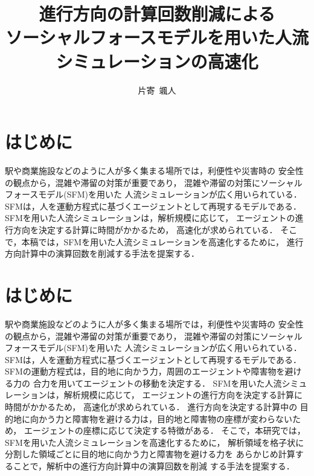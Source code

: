 \documentclass{maelab_y}
\newcommand{\分類条件}{
\begin{table}[t]
\begin{center}
\caption{進行方向を分類する条件}
\ecaption{Classification condition of moving direction $e_{i}$.}
\label{tb:hantei_jouken}
\begin{tabular}{c|c|c|c|c}
\hline \hline
			& 右 & 左 & 上 & 下 \\ \hline
パターン2   & $\frac{1}{\sqrt{2}} < e_x \leq 1  $
		    & $ -1 \leq e_x < \frac{-1}{\sqrt{2}}$ 
		    & $ \frac{-1}{\sqrt{2}} < e_x < \frac{1}{\sqrt{2}} $ 
		    & $ \frac{-1}{2} < e_x < \frac{1}{2} $ \\
パターン3   & $\frac{-1}{2} < e_y < \frac{1}{2} $ 
		    & $\frac{-1}{2} < e_y < \frac{1}{2} $
            & $ \frac{1}{\sqrt{2}} < e_y \leq 1$
		    & $ -1 \leq e_y < \frac{-1}{\sqrt{2}} $ \\
\hline
\multirow{2}{*}{パターン4}   
			& $R_x \geq A_x$ & $R_x < A_x$ & $R_y \geq A_y$ & $R_y < A_y $ \\
	        &  $L_x \geq A_x$ & $L_x < A_x$ & $L_y \geq A_y$ & $L_y < A_y$ \\
\hline
\multirow{2}{*}{パターン5}   
 			& $R_x \geq x_1$ & $R_x < x_2$ & $R_y \geq y_1$ & $R_y < y_2 $ \\
			& $L_x \geq x_1$ & $L_x < x_2$ & $L_y \geq y_1$ & $L_y < y_2 $ \\
\hline
パターン6   & $ \cos(\frac{1}{2}\theta_{view}) \leq  e_y $ 
			& $ e_y \leq -\cos(\frac{1}{2}\theta_{view})$ 
			& $ \sin(\frac{1}{2}(\pi - \theta_{view})) \leq e_x $ 
			& $ e_x \leq \sin(\frac{1}{2}(\pi - \theta_{view}))  $ \\
\hline
\end{tabular}
\end{center}
\end{table}}
\newcommand{\距離計算回数}{
\begin{table}[hbtp]
\begin{center}
\caption{エージェント間距離の計算回数[$10^{10}$回]}
\label{tb:count_result_yobi}
\begin{tabular}{c|r|r|r|r|r|r}
\hline \hline
	人数 & 1 & 2 & 3 & 4 & 5 & 6 \\  
	\hline
	\multirow{2}{*}{3000} 
	& 5.1   & $\mathbf{3.9}$   & 4.0    & 4.4    & 4.1    & 4.4   \\  
	&       & ($\mathbf{24.5}$\%) 					& (22.9\%) & (15.3\%) & (20.7\%) & (15.2\%) \\ \hline
	\multirow{2}{*}{5000} 
	& 14.4  &  $\mathbf{10.9}$  					  & 11.1   & 12.2   & 11.4   & 12.2  \\  
	&       & ($\mathbf{23.8}$\%) 					& (22.6\%) & (15.2\%) & (20.5\%) & (15.1\%) \\ \hline
	\multirow{2}{*}{7500} 
	& 33.1  & $\mathbf{25.2}$	 		    	 	 & 25.8   & 28.3   & 26.7   & 28.3  \\ 
	&       & ($\mathbf{23.9}$\%) 					& (22.2\%) & (14.6\%) & (19.4\%) & (14.6\%) \\ \hline
    \end{tabular}
  \end{center}
\end{table}}
\begin{document}
\title{進行方向の計算回数削減による
\\ソーシャルフォースモデルを用いた人流シミュレーションの高速化}
\author{片寄\ 颯人}
\maketitle

\section{はじめに}
駅や商業施設などのように人が多く集まる場所では，利便性や災害時の
安全性の観点から，混雑や滞留の対策が重要であり，
混雑や滞留の対策にソーシャルフォースモデル(SFM)を用いた
人流シミュレーションが広く用いられている\cite{helbing_sfm}．
SFMは，人を運動方程式に基づくエージェントとして再現するモデルである．
SFMを用いた人流シミュレーションは，解析規模に応じて，
エージェントの進行方向を決定する計算に時間がかかるため，
高速化が求められている．
そこで，本稿では，SFMを用いた人流シミュレーションを高速化するために，
進行方向計算中の演算回数を削減する手法を提案する．
\fi

\section{はじめに}
駅や商業施設などのように人が多く集まる場所では，利便性や災害時の
安全性の観点から，混雑や滞留の対策が重要であり，
混雑や滞留の対策にソーシャルフォースモデル(SFM)を用いた
人流シミュレーションが広く用いられている\cite{helbing_sfm}．
SFMは，人を運動方程式に基づくエージェントとして再現するモデルである．
SFMの運動方程式は，目的地に向かう力，周囲のエージェントや障害物を避ける力の
合力を用いてエージェントの移動を決定する．
SFMを用いた人流シミュレーションは，解析規模に応じて，
エージェントの進行方向を決定する計算に時間がかかるため，
高速化が求められている．
進行方向を決定する計算中の
目的地に向かう力と障害物を避ける力は，目的地と障害物の座標が変わらないため，
エージェントの座標に応じて決定する特徴がある．
そこで，本研究では，SFMを用いた人流シミュレーションを高速化するために，
解析領域を格子状に分割した領域ごとに目的地に向かう力と障害物を避ける力を
あらかじめ計算することで，解析中の進行方向計算中の演算回数を削減
する手法を提案する．
\end{document}
